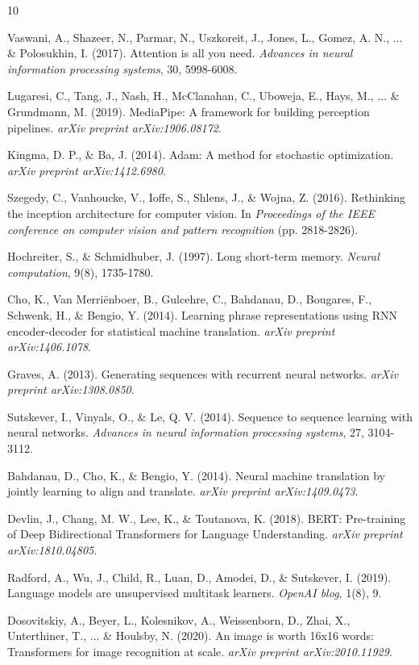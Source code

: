 \documentclass[12pt,a4paper]{article}
\begin{document}
\begin{thebibliography}{10}

Vaswani, A., Shazeer, N., Parmar, N., Uszkoreit, J., Jones, L., Gomez, A. N., ... \& Polosukhin, I. (2017). Attention is all you need. \textit{Advances in neural information processing systems}, 30, 5998-6008.

Lugaresi, C., Tang, J., Nash, H., McClanahan, C., Uboweja, E., Hays, M., ... \& Grundmann, M. (2019). MediaPipe: A framework for building perception pipelines. \textit{arXiv preprint arXiv:1906.08172}.

Kingma, D. P., \& Ba, J. (2014). Adam: A method for stochastic optimization. \textit{arXiv preprint arXiv:1412.6980}.

Szegedy, C., Vanhoucke, V., Ioffe, S., Shlens, J., \& Wojna, Z. (2016). Rethinking the inception architecture for computer vision. In \textit{Proceedings of the IEEE conference on computer vision and pattern recognition} (pp. 2818-2826).

Hochreiter, S., \& Schmidhuber, J. (1997). Long short-term memory. \textit{Neural computation}, 9(8), 1735-1780.

Cho, K., Van Merriënboer, B., Gulcehre, C., Bahdanau, D., Bougares, F., Schwenk, H., \& Bengio, Y. (2014). Learning phrase representations using RNN encoder-decoder for statistical machine translation. \textit{arXiv preprint arXiv:1406.1078}.

Graves, A. (2013). Generating sequences with recurrent neural networks. \textit{arXiv preprint arXiv:1308.0850}.

Sutskever, I., Vinyals, O., \& Le, Q. V. (2014). Sequence to sequence learning with neural networks. \textit{Advances in neural information processing systems}, 27, 3104-3112.

Bahdanau, D., Cho, K., \& Bengio, Y. (2014). Neural machine translation by jointly learning to align and translate. \textit{arXiv preprint arXiv:1409.0473}.

Devlin, J., Chang, M. W., Lee, K., \& Toutanova, K. (2018). BERT: Pre-training of Deep Bidirectional Transformers for Language Understanding. \textit{arXiv preprint arXiv:1810.04805}.

Radford, A., Wu, J., Child, R., Luan, D., Amodei, D., \& Sutskever, I. (2019). Language models are unsupervised multitask learners. \textit{OpenAI blog}, 1(8), 9.

Dosovitskiy, A., Beyer, L., Kolesnikov, A., Weissenborn, D., Zhai, X., Unterthiner, T., ... \& Houlsby, N. (2020). An image is worth 16x16 words: Transformers for image recognition at scale. \textit{arXiv preprint arXiv:2010.11929}.

\end{thebibliography}
\end{document}
